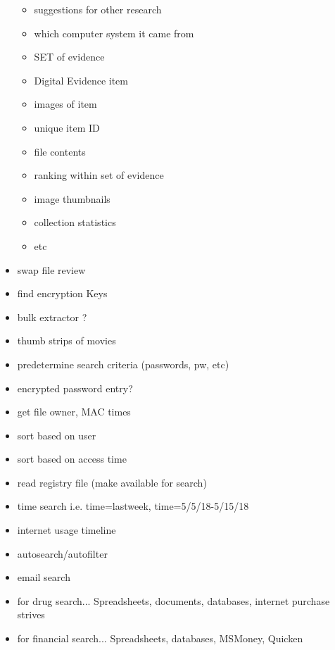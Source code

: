 \documentclass[12pt]{article}
\begin{document}
\begin{itemize}
\begin{itemize}
    \item suggestions for other research
    \item which computer system it came from
    \item SET of evidence
    \item Digital Evidence item
    \item images of item
    \item unique item ID
    \item file contents
    \item ranking within set of evidence
    \item image thumbnails
    \item collection statistics
    \item etc
  \end{itemize}
  \item swap file review
  \item find encryption Keys 
  \item bulk extractor ? 
  \item thumb strips of movies
  \item predetermine search criteria (passwords, pw, etc)
  \item encrypted password entry?
  \item get file owner, MAC times
  \item sort based on user
  \item sort based on access time
  \item read registry file (make available for search)
  \item time search i.e. time=lastweek, time=5/5/18-5/15/18
  \item internet usage timeline
  \item autosearch/autofilter
  \item email search
  \item for drug search... Spreadsheets, documents, databases, internet purchase strives
  \item for financial search... Spreadsheets, databases, MSMoney, Quicken

\end{itemize}

\newpage
\end{document}
